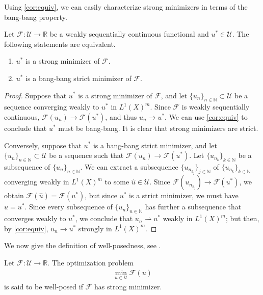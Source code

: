 \documentclass[hidelinks,onefignum,onetabnum]{siamart220329}
\begin{document}
Using \cref{cor:equiv}, we can easily characterize strong minimizers in terms of the bang-bang property. 

\begin{proposition}\label{strongmin}
	Let $\mathcal F:\mathcal U\to\mathbb R$ be a weakly sequentially continuous functional and  $u^*\in\mathcal U$. The following statements are equivalent. 
	\begin{enumerate}
		\item $u^*$ is a strong minimizer of $\mathcal F$.
		\item $u^*$ is a bang-bang strict minimizer of $\mathcal F$.
	\end{enumerate}
\end{proposition}
\begin{proof}
	Suppose that $u^*$ is a strong minimizer of $\mathcal F$, and let $\{u_{n}\}_{n\in\mathbb N}\subset\mathcal U$ be a sequence converging weakly to $u^*$ in ${L^1(X)^m}$. Since $\mathcal F$ is weakly sequentially continuous, $\mathcal F(u_n)\to\mathcal F(u^*)$, and thus $u_n\to u^*$. We can use \cref{cor:equiv} to conclude that $u^*$ must be bang-bang. It is clear that strong minimizers are strict.
	
	Conversely, suppose that $u^*$ is a bang-bang strict minimizer, and  let $\{u_{n}\}_{n\in\mathbb N}\subset \mathcal U$ be a sequence such that $\mathcal F(u_n)\to\mathcal F(u^*)$. Let $\{u_{n_k}\}_{k\in\mathbb N}$ be a subsequence of $\{u_{n}\}_{n\in\mathbb N}$.  We can extract a subsequence $\{u_{n_{k_j}}\}_{j\in\mathbb N}$ of $\{u_{n_k}\}_{k\in\mathbb N}$  converging weakly in ${L^1(X)^m}$ to some $\hat u\in\mathcal U$. Since $\mathcal F(u_{n_{k_j}})\to\mathcal F(u^*)$, we obtain $\mathcal F(\hat u)=\mathcal F(u^*)$, but since $u^*$ is a strict minimizer, we must have $\hat u=u^*$. Since every subsequence of $\{u_n\}_{n\in\mathbb N}$ has further a subsequence that converges weakly to $u^*$, we conclude that $u_n \rightharpoonup u^*$ weakly in ${L^1(X)^m}$; but then, by  \cref{cor:equiv}, $u_{n}\to u^*$ strongly in ${L^1(X)^m}$.
\end{proof}

We now give the definition of well-posedness, see \cite[Section 1.7]{Penot2013}.
\begin{definition}
	Let $\mathcal F:\mathcal U\to\mathbb R$. The optimization problem 
	\begin{align*}
		\min_{u\in\mathcal U}\mathcal F(u)
	\end{align*}
is said to be well-posed if $\mathcal F$ has strong minimizer.
\end{definition}
\end{document}
